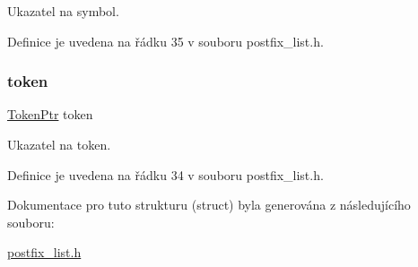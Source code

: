 Ukazatel na symbol. 



Definice je uvedena na řádku 35 v souboru postfix\+\_\+list.\+h.

\mbox{\label{struct_s___postfix_list_item_a15041877995067114b025a8d4de79e05}} 
\subsubsection{\texorpdfstring{token}{token}}
{\footnotesize\ttfamily \hyperlink{token_8h_aa80161bf9be61c651bc95eafc643d9a5}{Token\+Ptr} token}



Ukazatel na token. 



Definice je uvedena na řádku 34 v souboru postfix\+\_\+list.\+h.



Dokumentace pro tuto strukturu (struct) byla generována z následujícího souboru\+:\begin{DoxyCompactItemize}
\item 
\hyperlink{postfix__list_8h}{postfix\+\_\+list.\+h}\end{DoxyCompactItemize}

